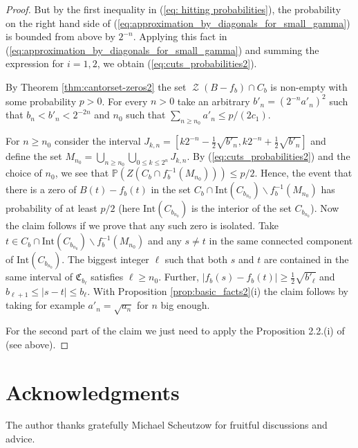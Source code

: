 \documentclass[11pt,reqno]{amsart}
\theoremstyle{plain}
\theoremstyle{definition}
\theoremstyle{remark}
\begin{document}
\begin{proof}
But by the first inequality in (\ref{eq: hitting probabilities}), the probability on the right hand side of (\ref{eq:approximation_by_diagonals_for_small_gamma}) is bounded from above by $2^{-n}$. Applying this fact in (\ref{eq:approximation_by_diagonals_for_small_gamma}) and summing the expression for $i=1,2$, we obtain (\ref{eq:cuts_probabilities2}).

By Theorem \ref{thm:cantorset-zeros2} the set $\operatorname{\mathcal{Z}}(B-f_b) \cap C_b$ is non-empty with some probability $p>0$.
For every $n>0$ take an arbitrary $b'_n=(2^{-n}a'_n)^2$ such that $b_n < b'_n < 2^{-2n}$ and $n_0$ such that $\sum_{n\geq n_0} a'_n \leq p/(2c_1)$.

For $n \geq n_0$ consider the interval $J_{k,n}=[k2^{-n}-\frac{1}{2}\sqrt{b'_n}, k2^{-n}+\frac{1}{2}\sqrt{b'_n}]$ and define the set $M_{n_0}= \bigcup_{n \geq n_0} \bigcup_{0 \leq k \leq 2^{n}}J_{k,n}$. By (\ref{eq:cuts_probabilities2}) and the choice of $n_0$, we see that $\mathbb{P}(Z(C_b \cap f_b^{-1}(M_{n_0}))) \leq p/2$. Hence, the event that there is a zero of $B(t)-f_{b}(t)$ in the set $C_b \cap \text{Int}(C_{b_{n_0}})\backslash f_b^{-1}(M_{n_0})$ has probability of at least $p/2$ (here $\text{Int}(C_{b_{n_0}})$ is the interior of the set $C_{b_{n_0}}$). Now the claim follows if we prove that any such zero is isolated. Take $t \in C_b \cap \text{Int}(C_{b_{n_0}})\backslash f_b^{-1}(M_{n_0})$ and any $s \ne t$ in the same connected component of $\text{Int}(C_{b_{n_0}})$. The biggest integer $\ell$ such that both $s$ and $t$ are contained in the same interval of $\mathfrak{C}_{b_\ell}$ satisfies $\ell \geq n_0$.
Further, $|f_b(s)-f_b(t)| \geq \frac{1}{2}\sqrt{b'_\ell}$ and $b_{\ell+1} \leq |s-t| \leq b_{\ell}$. With Proposition \ref{prop:basic_facts2}(i) the claim follows by taking for example $a'_n = \sqrt{a_n}$ for $n$ big enough.

For the second part of the claim we just need to apply the Proposition 2.2.(i) of \cite{ABPR} (see above).
\end{proof}

\section*{Acknowledgments}
The author thanks gratefully Michael Scheutzow for fruitful discussions and advice.
\end{document}
